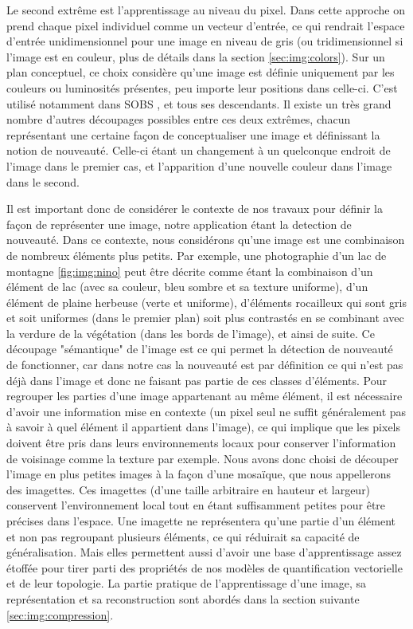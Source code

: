 	Le second extrême est l'apprentissage au niveau du pixel. Dans cette approche on prend chaque pixel individuel comme un vecteur d'entrée, ce qui rendrait l'espace d'entrée unidimensionnel pour une image en niveau de gris (ou tridimensionnel si l'image est en couleur, plus de détails dans la section \ref{sec:img:colors}). Sur un plan conceptuel, ce choix considère qu'une image est définie uniquement par les couleurs ou luminosités présentes, peu importe leur positions dans celle-ci. C'est utilisé notamment dans SOBS \cite{maddalena2008self}, et tous ses descendants. Il existe un très grand nombre d'autres découpages possibles entre ces deux extrêmes, chacun représentant une certaine façon de conceptualiser une image et définissant la notion de nouveauté. Celle-ci étant un changement à un quelconque endroit de l'image dans le premier cas, et l'apparition d'une nouvelle couleur dans l'image dans le second.

	Il est important donc de considérer le contexte de nos travaux pour définir la façon de représenter une image, notre application étant la detection de nouveauté. Dans ce contexte, nous considérons qu'une image est une combinaison de nombreux éléments plus petits. Par exemple, une photographie d'un lac de montagne \ref{fig:img:nino} peut être décrite comme étant la combinaison d'un élément de lac (avec sa couleur, bleu sombre et sa texture uniforme), d'un élément de plaine herbeuse (verte et uniforme), d'éléments rocailleux qui sont gris et soit uniformes (dans le premier plan) soit plus contrastés en se combinant avec la verdure de la végétation (dans les bords de l'image), et ainsi de suite. Ce découpage "sémantique" de l'image est ce qui permet la détection de nouveauté  de fonctionner, car dans notre cas la nouveauté est par définition ce qui n'est pas déjà dans l'image et donc ne faisant pas partie de ces classes d'éléments. Pour regrouper les parties d'une image appartenant au même élément, il est nécessaire d'avoir une information mise en contexte (un pixel seul ne suffit généralement pas à savoir à quel élément il appartient dans l'image), ce qui implique que les pixels doivent être pris dans leurs environnements locaux pour conserver l'information de voisinage comme la texture par exemple. Nous avons donc choisi de découper l'image en plus petites images à la façon d'une mosaïque, que nous appellerons des imagettes. Ces imagettes (d'une taille arbitraire en hauteur et largeur) conservent l'environnement local tout en étant suffisamment petites pour être précises dans l'espace. Une imagette ne représentera qu'une partie d'un élément et non pas regroupant plusieurs éléments, ce qui réduirait sa capacité de généralisation. Mais elles permettent aussi d'avoir une base d'apprentissage assez étoffée pour tirer parti des propriétés de nos modèles de quantification vectorielle et de leur topologie. La partie pratique de l'apprentissage d'une image, sa représentation et sa reconstruction sont abordés dans la section suivante \ref{sec:img:compression}.


